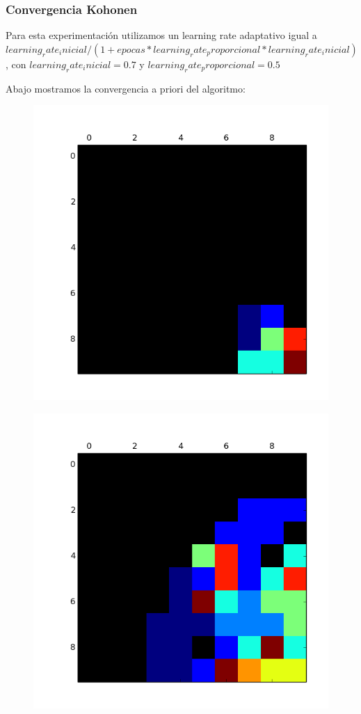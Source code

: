 \subsubsection{Convergencia Kohonen}

Para esta experimentación utilizamos un learning rate adaptativo igual a $learning_rate_inicial / (1 + epocas * learning_rate_proporcional * learning_rate_inicial)$, con $learning_rate_inicial=0.7$  y $learning_rate_proporcional=0.5$

Abajo mostramos la convergencia a priori del algoritmo:

\begin{figure}[h!]
\centering
\begin{minipage}{.15\textwidth}
  \centering
  \includegraphics[width=.9\linewidth]{img/convergencia_kohonen/entrenamiento_0.png}
  \label{fig:test1}
\end{minipage}%
\begin{minipage}{.15\textwidth}
  \centering
  \includegraphics[width=.9\linewidth]{img/convergencia_kohonen/entrenamiento_25.png}

\end{minipage}
\end{figure}
